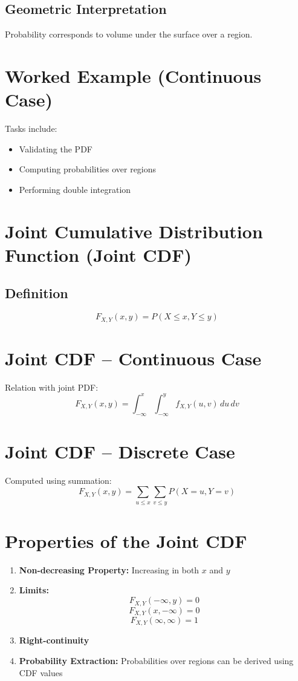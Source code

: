\documentclass[11pt]{article}
\begin{document}
\subsection{Geometric Interpretation}
Probability corresponds to volume under the surface over a region.

\section{Worked Example (Continuous Case)}

Tasks include:
\begin{itemize}
    \item Validating the PDF
    \item Computing probabilities over regions
    \item Performing double integration
\end{itemize}

\section{Joint Cumulative Distribution Function (Joint CDF)}

\subsection{Definition}
\[
F_{X,Y}(x,y) = P(X \leq x, Y \leq y)
\]

\section{Joint CDF -- Continuous Case}

Relation with joint PDF:
\[
F_{X,Y}(x,y) = \int_{-\infty}^{x} \int_{-\infty}^{y} f_{X,Y}(u,v)\,du\,dv
\]

\section{Joint CDF -- Discrete Case}

Computed using summation:
\[
F_{X,Y}(x,y) = \sum_{u \leq x} \sum_{v \leq y} P(X = u, Y = v)
\]

\section{Properties of the Joint CDF}

\begin{enumerate}
    \item \textbf{Non-decreasing Property:} Increasing in both $x$ and $y$
    \item \textbf{Limits:}
    \[
    F_{X,Y}(-\infty, y) = 0
    \]
    \[
    F_{X,Y}(x, -\infty) = 0
    \]
    \[
    F_{X,Y}(\infty, \infty) = 1
    \]
    \item \textbf{Right-continuity}
    \item \textbf{Probability Extraction:} Probabilities over regions can be derived using CDF values
\end{enumerate}
\end{document}
